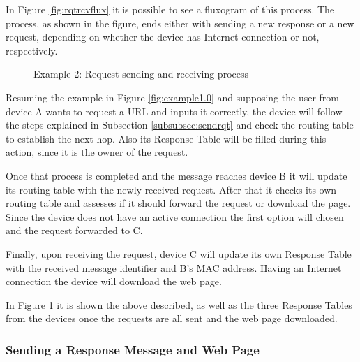 In Figure \ref{fig:rqtrcvflux} it is possible to see a fluxogram of this process. The process, as shown in the figure, ends either with sending a new response or a new request, depending on whether the device has Internet connection or not, respectively.

\begin{figure}[ht]
   \noindent{}
	\caption{\label{fig:example1.1} Example 2: Request sending and receiving process}
\end{figure}

Resuming the example in Figure \ref{fig:example1.0} and supposing the user from device A wants to request a \gls{URL} and inputs it correctly, the device will follow the steps explained in Subsection \ref{subsubsec:sendrqt} and check the routing table to establish the next hop. Also its Response Table will be filled during this action, since it is the owner of the request.

Once that process is completed and the message reaches device B it will update its routing table with the newly received request. After that it checks its own routing table and assesses if it should forward the request or download the page. Since the device does not have an active connection the first option will chosen and the request forwarded to C.

Finally, upon receiving the request, device C will update its own Response Table with the received message identifier and B's \gls{MAC} address. Having an Internet connection the device will download the web page.

In Figure \ref{fig:example1.1} it is shown the above described, as well as the three Response Tables from the devices once the requests are all sent and the web page downloaded.

\subsubsection{Sending a Response Message and Web Page}
\label{subsubsec:sendrsp}

